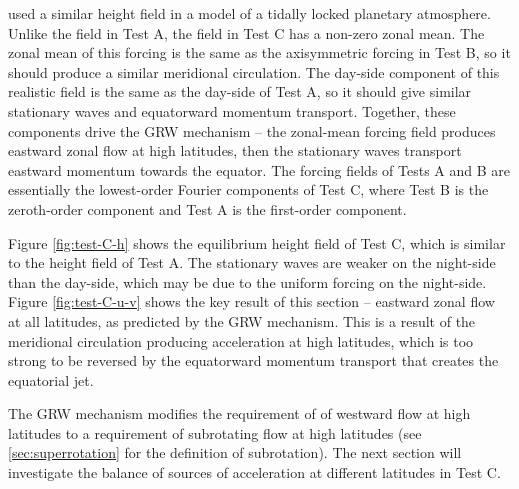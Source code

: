 \citet{perez2013atmospheric} used a similar height field in a model of a tidally locked planetary atmosphere. Unlike the field in Test A, the field in Test C has a non-zero zonal mean. The zonal mean of this forcing is the same as the axisymmetric forcing in Test B, so it should produce a similar meridional circulation. The day-side component of this realistic field is the same as the day-side of Test A, so it should give similar stationary waves and equatorward momentum transport. Together, these components drive the GRW mechanism -- the zonal-mean forcing field produces eastward zonal flow at high latitudes, then the stationary waves transport eastward momentum towards the equator. The forcing fields of Tests A and B are essentially the lowest-order Fourier components of Test C, where Test B is the zeroth-order component and Test A is the first-order component.

Figure \ref{fig:test-C-h} shows the equilibrium height field of Test C, which is similar to the height field of Test A. The stationary waves are weaker on the night-side than the day-side, which may be due to the uniform forcing on the night-side. Figure \ref{fig:test-C-u-v} shows the key result of this section -- eastward zonal flow at all latitudes, as predicted by the GRW mechanism. This is a result of the meridional circulation producing acceleration at high latitudes, which is too strong to be reversed by the equatorward momentum transport that creates the equatorial jet.

The GRW mechanism modifies the requirement of \citet{showman2011superrotation} of westward flow at high latitudes to a requirement of subrotating flow at high latitudes (see \ref{sec:superrotation} for the definition of subrotation). The next section will investigate the balance of sources of acceleration at different latitudes in Test C.




%



%
%


